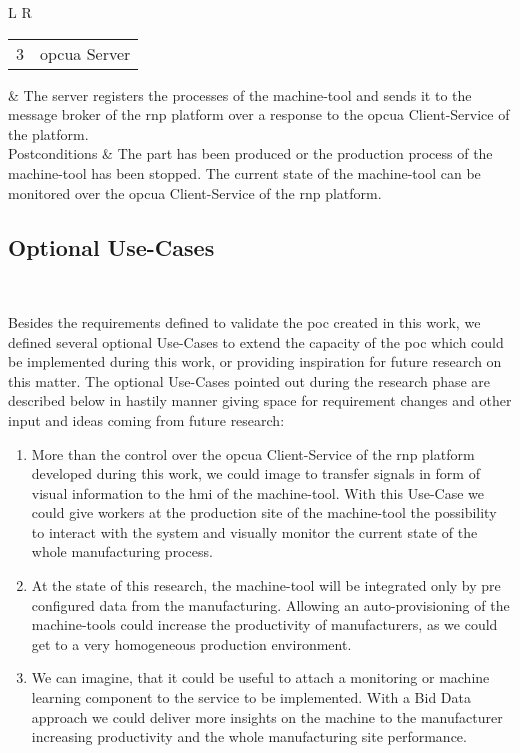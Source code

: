 \documentclass[
a4paper,
twoside,
headsepline,
cleardoublepage=empty,
parskip=half,
draft=false
]{scrbook}
\begin{document}
\begin{table}[hbtp]
\begin{tabular}{L R}
						\\ \midrule
						\begin{tabular}{c c} 3 & \gls{opcua} Server \end{tabular} & The server registers the processes of the machine-tool and sends it to the message broker of the \gls{rnp} platform over a response to the \gls{opcua} Client-Service of the platform.
						\\ \midrule
						Postconditions & The part has been produced or the production process of the machine-tool has been stopped. The current state of the machine-tool can be monitored over the \gls{opcua} Client-Service of the \gls{rnp} platform.
						\\ \bottomrule
					\end{tabular}
				\end{table}

			\subsection{Optional Use-Cases} \label{subsec:optional}

				Besides the requirements defined to validate the \gls{poc} created in this work, we defined several optional Use-Cases to extend the capacity of the \gls{poc} which could be implemented during this work, or providing inspiration for future research on this matter.
				The optional Use-Cases pointed out during the research phase are described below in hastily manner giving space for requirement changes and other input and ideas coming from future research:

				\begin{enumerate}

					\item More than the control over the \gls{opcua} Client-Service of the \gls{rnp} platform developed during this work, we could image to transfer signals in form of visual information to the \gls{hmi} of the machine-tool. With this Use-Case we could give workers at the production site of the machine-tool the possibility to interact with the system and visually monitor the current state of the whole manufacturing process.

					\item At the state of this research, the machine-tool will be integrated only by pre configured data from the manufacturing. Allowing an auto-provisioning of the machine-tools could increase the productivity of manufacturers, as we could get to a very homogeneous production environment.

					\item We can imagine, that it could be useful to attach a monitoring or machine learning component to the service to be implemented. With a Bid Data approach we could deliver more insights on the machine to the manufacturer increasing productivity and the whole manufacturing site performance.

				\end{enumerate}
\end{document}
